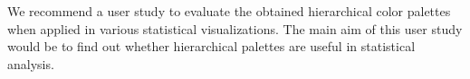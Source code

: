 \documentclass[journal]{vgtc}                %
\begin{document}
We recommend a user study to evaluate the obtained hierarchical color palettes when applied in various statistical visualizations. The main aim of this user study would be to find out whether hierarchical palettes are useful in statistical analysis.





\end{document}
